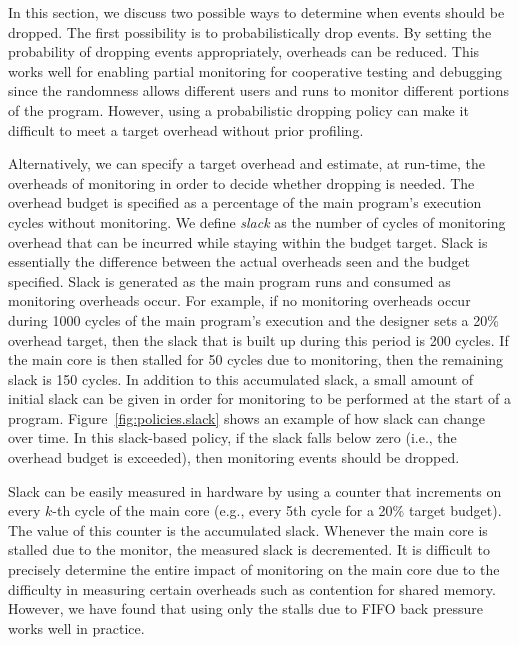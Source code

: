 In this section, we discuss two possible ways to determine when events should be dropped.
The first possibility is to probabilistically drop events. By setting the probability of
dropping events appropriately, overheads can be reduced. This works well for
enabling partial monitoring for cooperative testing and debugging since the
randomness allows different users and runs to monitor different portions of the
program. However, using a probabilistic dropping policy can make it difficult
to meet a target overhead without prior profiling.

Alternatively, we can specify a target overhead and estimate, at run-time, the
overheads of monitoring in order to decide whether dropping is needed.
The overhead budget is specified as a percentage of the main program's execution
cycles without monitoring. We define \emph{slack} as the number of cycles of
monitoring overhead that can be incurred while staying within the budget
target. Slack is essentially the difference between the actual overheads seen
and the budget specified. Slack is generated as the main program runs and consumed as monitoring overheads occur.  For
example, if no monitoring overheads occur during 1000 cycles of the main
program's execution and the designer sets a 20\% overhead target, then the
slack that is built up during this period is 200 cycles. If the main core is
then stalled for 50 cycles due to monitoring, then the remaining slack is 150
cycles. 
In addition to this accumulated slack, a small amount of initial slack
can be given in order for monitoring to be performed at the start of a program.
Figure~\ref{fig:policies.slack} shows an example of how slack can change over time.
In this slack-based policy, if the slack falls below zero (i.e., the overhead budget is exceeded), then
monitoring events should be dropped.


Slack can be easily measured in hardware by using a counter that increments on every $k$-th
cycle of the main core (e.g., every 5th cycle for a 20\% target budget). 
The value of this counter is the
accumulated slack. Whenever the main core is stalled due to the monitor, the
measured slack is decremented. It is difficult to precisely determine the
entire impact of monitoring on the main core due to the
difficulty in measuring certain overheads such as contention for shared memory.
However, we have found that using only the stalls due to FIFO back pressure
works well in practice.

